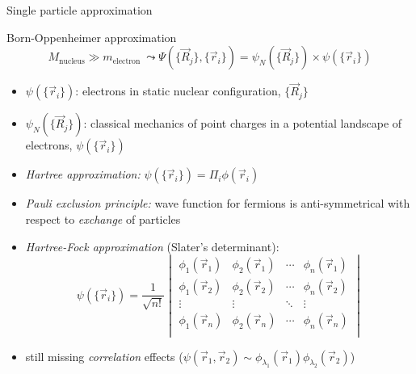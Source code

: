 \documentclass[noamsthm,8pt,t,xcolor={dvipsnames}]{beamer}
\begin{document}
\begin{frame}{Single particle approximation}
\vspace*{-3mm}
\begin{block}{Born-Oppenheimer approximation}
  $$M_\mathrm{nucleus}\gg m_\mathrm{electron}\ \leadsto \Psi(\{\vec R_j\},\{\vec r_i\}) = \psi_N(\{\vec R_j\})\times\psi(\{\vec r_i\})$$\vspace{-4mm}
  \begin{itemize}
    \item $\psi(\{\vec r_i\})$: electrons in static nuclear configuration, $\{\vec R_j\}$
    \item $\psi_N(\{\vec R_j\})$: classical mechanics of point charges in a potential landscape of electrons, $\psi(\{\vec r_i\})$
  \end{itemize}
\end{block}

\pause

\begin{itemize}
  \item<2-> \emph{Hartree approximation:} $\psi(\{\vec r_i\})=\Pi_i\phi(\vec r_i)$\smallskip  
  \item<3-> \emph{Pauli exclusion principle:} wave function for fermions is anti-symmetrical with respect to \emph{exchange} of particles\smallskip  
  \item<4-> \emph{Hartree-Fock approximation} (Slater's determinant): $$\psi(\{\vec r_i\})=\frac1{\sqrt{n!}}\begin{vmatrix}
      \phi_{1}(\vec r_1)&\phi_{2}(\vec r_1)&\cdots&\phi_n(\vec r_1)\\
      \phi_{1}(\vec r_2)&\phi_{2}(\vec r_2)&\cdots&\phi_n(\vec r_2)\\
      \vdots&\vdots&\ddots&\vdots\\
      \phi_{1}(\vec r_n)&\phi_{2}(\vec r_n)&\cdots&\phi_n(\vec r_n)\\
    \end{vmatrix}$$\vspace*{0.1mm}
  \item<5-> still missing \emph{correlation} effects ($\psi(\vec r_1, \vec r_2)\sim\phi_{\lambda_1}(\vec r_1)\phi_{\lambda_2}(\vec r_2)$)
\end{itemize}
\end{frame}
\end{document}
